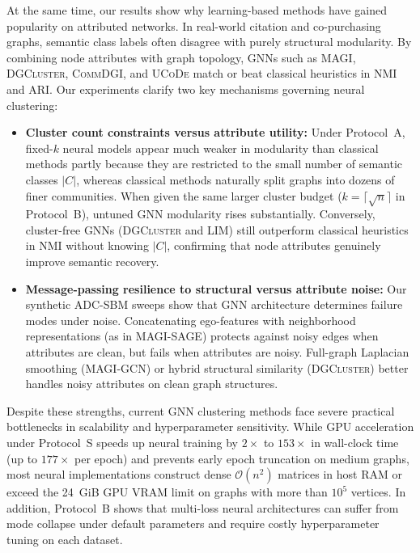 \documentclass[11pt,a4paper]{article}
\begin{document}
At the same time, our results show why learning-based methods have gained popularity on attributed networks. In real-world citation and co-purchasing graphs, semantic class labels often disagree with purely structural modularity. By combining node attributes with graph topology, GNNs such as \textsc{MAGI}, \textsc{DGCluster}, \textsc{CommDGI}, and \textsc{UCoDe} match or beat classical heuristics in NMI and ARI. Our experiments clarify two key mechanisms governing neural clustering:
\begin{itemize}
    \item \textbf{Cluster count constraints versus attribute utility:} Under Protocol~A, fixed-$k$ neural models appear much weaker in modularity than classical methods partly because they are restricted to the small number of semantic classes $|C|$, whereas classical methods naturally split graphs into dozens of finer communities. When given the same larger cluster budget ($k = \lceil\sqrt{n}\rceil$ in Protocol~B), untuned GNN modularity rises substantially. Conversely, cluster-free GNNs (\textsc{DGCluster} and \textsc{LIM}) still outperform classical heuristics in NMI without knowing $|C|$, confirming that node attributes genuinely improve semantic recovery.
    \item \textbf{Message-passing resilience to structural versus attribute noise:} Our synthetic ADC-SBM sweeps show that GNN architecture determines failure modes under noise. Concatenating ego-features with neighborhood representations (as in \textsc{MAGI}-SAGE) protects against noisy edges when attributes are clean, but fails when attributes are noisy. Full-graph Laplacian smoothing (\textsc{MAGI}-GCN) or hybrid structural similarity (\textsc{DGCluster}) better handles noisy attributes on clean graph structures.
\end{itemize}

Despite these strengths, current GNN clustering methods face severe practical bottlenecks in scalability and hyperparameter sensitivity. While GPU acceleration under Protocol~S speeds up neural training by $2\times$ to $153\times$ in wall-clock time (up to $177\times$ per epoch) and prevents early epoch truncation on medium graphs, most neural implementations construct dense $\mathcal{O}(n^2)$ matrices in host RAM or exceed the 24~GiB GPU VRAM limit on graphs with more than $10^5$ vertices. In addition, Protocol~B shows that multi-loss neural architectures can suffer from mode collapse under default parameters and require costly hyperparameter tuning on each dataset.
\end{document}
